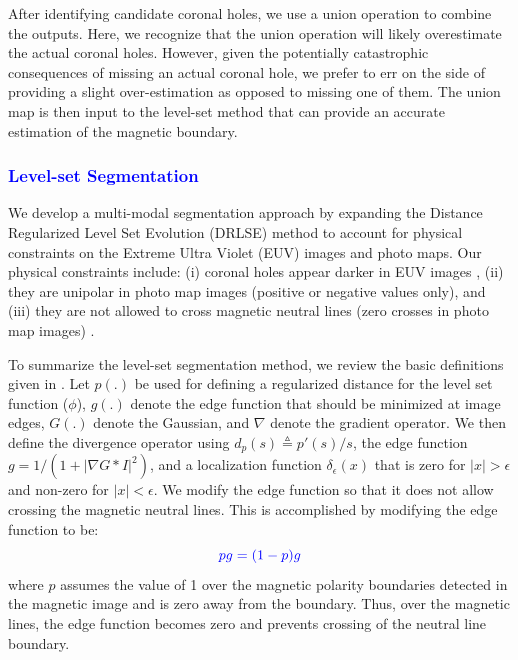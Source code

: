 \documentclass[journal]{IEEEtran}
\begin{document}
After identifying candidate coronal holes, we use a union
    operation to combine the outputs.
Here, we recognize that the union operation will likely
    overestimate the actual coronal holes.
However, given the potentially catastrophic consequences
    of missing an actual coronal hole, we prefer to err on
    the side of providing a slight
    over-estimation as opposed to missing one of them.
The union map is then input to the level-set method
    that can provide an accurate estimation
    of the magnetic boundary.
\color{black}
\subsubsection{\textcolor{blue}{Level-set Segmentation}}\label{sec:LS}
We develop a multi-modal segmentation approach by expanding
     the Distance Regularized Level Set Evolution (DRLSE) method \cite{chunming2010}
     to account for physical constraints on
     the Extreme Ultra Violet (EUV) images and photo maps.
Our physical constraints include:
     (i) coronal holes appear darker in EUV images \cite{altschuler1972coronal},
     (ii) they are unipolar in photo map images (positive or negative values only), and
     (iii) they are not allowed to cross magnetic neutral lines (zero crosses in
           photo map images)  \cite{antiochos2007structure}.

%           
%



           

To summarize the level-set segmentation method, we review
     the basic definitions given in \cite{chunming2010}.
Let $p(.)$ be used for defining a regularized distance for
     the level set function ($\phi$),
     $g(.)$ denote the edge function that  should be minimized at image edges,
     $G(.)$ denote the Gaussian, and
     $\nabla$ denote the gradient operator.
     We then define the divergence
     operator using
     $d_p(s) \overset{\vartriangle}{=} p'(s)/s$,
     the edge function
     $g=1/(1+|\nabla G*I |^2) $,
     and a localization function
     $\delta_\epsilon(x)$
     that is zero for  $|x|>\epsilon$ 
     and non-zero for $|x|<\epsilon$.
{\color{blue}
	We modify the edge function so that it does not allow crossing the magnetic neutral lines.
	This is accomplished by modifying the edge function to be:
	\begin{equation}
	\label{eq:pg}
	\color{blue}
	pg = (1-p) g
	\end{equation}
}
\color{blue}
where $p$ assumes the value of 1 over the magnetic polarity 
boundaries detected in the
magnetic image and is zero away from the boundary.
Thus, over the magnetic lines, the edge function becomes zero and prevents crossing of the neutral line boundary.
\end{document}
